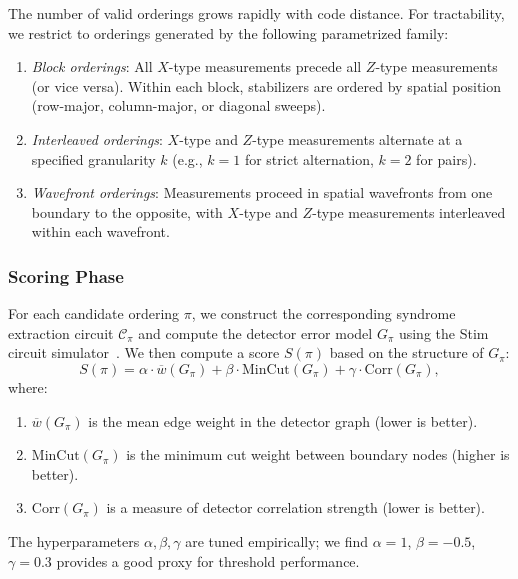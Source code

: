 \documentclass[
    reprint,
    aps,
    prx,
    superscriptaddress,
    longbibliography
]{revtex4-2}
\begin{document}
The number of valid orderings grows rapidly with code distance. For tractability, we restrict to orderings generated by the following parametrized family:
\begin{enumerate}[label=(\roman*)]
    \item \emph{Block orderings}: All $X$-type measurements precede all $Z$-type measurements (or vice versa). Within each block, stabilizers are ordered by spatial position (row-major, column-major, or diagonal sweeps).
    \item \emph{Interleaved orderings}: $X$-type and $Z$-type measurements alternate at a specified granularity $k$ (e.g., $k=1$ for strict alternation, $k=2$ for pairs).
    \item \emph{Wavefront orderings}: Measurements proceed in spatial wavefronts from one boundary to the opposite, with $X$-type and $Z$-type measurements interleaved within each wavefront.
\end{enumerate}

\subsubsection{Scoring Phase}

For each candidate ordering $\pi$, we construct the corresponding syndrome extraction circuit $\mathcal{C}_\pi$ and compute the detector error model $G_\pi$ using the Stim circuit simulator~\cite{Gidney2021Stim}. We then compute a score $S(\pi)$ based on the structure of $G_\pi$:
\begin{equation}
    S(\pi) = \alpha \cdot \overline{w}(G_\pi) + \beta \cdot \text{MinCut}(G_\pi) + \gamma \cdot \text{Corr}(G_\pi),
    \label{eq:score_function}
\end{equation}
where:
\begin{enumerate}[label=(\roman*)]
    \item $\overline{w}(G_\pi)$ is the mean edge weight in the detector graph (lower is better).
    \item $\text{MinCut}(G_\pi)$ is the minimum cut weight between boundary nodes (higher is better).
    \item $\text{Corr}(G_\pi)$ is a measure of detector correlation strength (lower is better).
\end{enumerate}
The hyperparameters $\alpha, \beta, \gamma$ are tuned empirically; we find $\alpha = 1$, $\beta = -0.5$, $\gamma = 0.3$ provides a good proxy for threshold performance.
\end{document}
